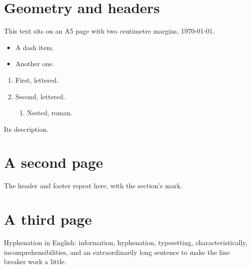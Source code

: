 \documentclass{article}
\begin{document}
\section{Geometry and headers}
This text sits on an A5 page with two centimetre margins, \today.
\begin{itemize}[label=--,itemsep=0pt]
\item A dash item.
\item Another one.
\end{itemize}
\begin{enumerate}[label=(\alph*),leftmargin=*]
\item First, lettered.
\item Second, lettered.
\begin{enumerate}[label=\roman*.]
\item Nested, roman.
\end{enumerate}
\end{enumerate}
\begin{description}[font=\sffamily]
\item[Term] Its description.
\end{description}
\newpage
\section{A second page}
The header and footer repeat here, with the section's mark.
\clearpage
\section{A third page}
Hyphenation in English: information, hyphenation, typesetting,
characteristically, incomprehensibilities, and an extraordinarily long
sentence to make the line breaker work a little.
\end{document}
